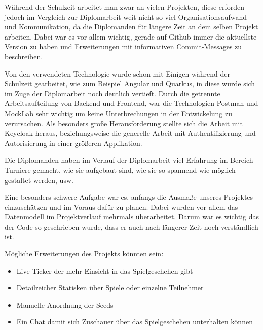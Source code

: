 Während der Schulzeit arbeitet man zwar an vielen Projekten,
diese erforden jedoch im Vergleich zur Diplomarbeit weit nicht so viel Organisationsaufwand und Kommunikation, da die Diplomanden
für längere Zeit an dem selben Projekt arbeiten. Dabei war es vor allem wichtig, gerade auf Github immer die aktuellste Version zu haben und Erweiterungen mit
informativen Commit-Messages zu beschreiben. 

Von den verwendeten Technologie wurde schon mit Einigen während der Schulzeit gearbeitet, wie zum Beispiel Angular und Quarkus, in diese wurde sich im Zuge der Diplomarbeit noch deutlich vertieft.
Durch die getrennte Arbeitsaufteilung von Backend und Frontend, war die Technologien Postman und MockLab sehr wichtig um keine Unterbrechungen in der Entwickelung zu verursachen.
Als besonders große Herausforderung stellte sich die Arbeit mit Keycloak heraus, beziehungsweise die generelle Arbeit mit Authentifizierung und Autorisierung in einer größeren Applikation.

Die Diplomanden haben im Verlauf der Diplomarbeit viel Erfahrung im Bereich Turniere gemacht, wie sie aufgebaut sind, wie sie so spannend wie möglich gestaltet werden, 
usw.

Eine besonders schwere Aufgabe war es, anfangs die Ausmaße unseres Projektes einzuschätzen und im Voraus dafür zu planen. Dabei wurden vor allem das Datenmodell im Projektverlauf mehrmals überarbeitet.
Darum war es wichtig das der Code so geschrieben wurde, dass er auch nach längerer Zeit noch verständlich ist.

Mögliche Erweiterungen des Projekts könnten sein:

\begin{itemize}
    \item Live-Ticker der mehr Einsicht in das Spielgeschehen gibt
    \item Detailreicher Statisken über Spiele oder einzelne Teilnehmer
    \item Manuelle Anordnung der Seeds
    \item Ein Chat damit sich Zuschauer über das Spielgeschehen unterhalten können
\end{itemize}